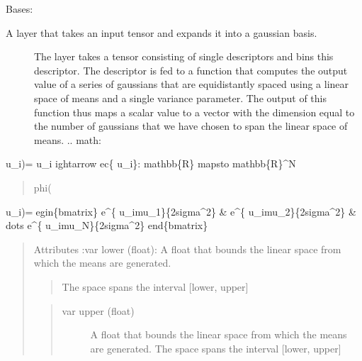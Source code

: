 \documentclass[letterpaper,10pt,english]{sphinxmanual}
\begin{document}

\begin{fulllineitems}
\label{\detokenize{modules/gqcml.nn:gqcml.nn.layers.GaussianExpansion}}
Bases: 
\begin{description}
\item[{A layer that takes an input tensor and expands it into a gaussian basis.}] \leavevmode
The layer takes a tensor consisting of single descriptors and bins this descriptor.
The descriptor is fed to a function that computes the output value of a series of gaussians
that are equidistantly spaced using a linear space of means and a single variance parameter.
The output of this function thus maps a scalar value to a vector with the dimension equal to the
number of gaussians that we have chosen to span the linear space of means.
.. math:

\begin{sphinxVerbatim}[commandchars=\\\{\}]
\PYGZbs{}
\end{sphinxVerbatim}

\end{description}

u\_i)=
u\_i
ightarrow
ec\{
u\_i\}: mathbb\{R\} mapsto mathbb\{R\}\textasciicircum{}N
\begin{quote}

phi(
\end{quote}

u\_i)=egin\{bmatrix\} e\textasciicircum{}\{
u\_i\sphinxhyphen{}mu\_1\}\{2sigma\textasciicircum{}2\} \& e\textasciicircum{}\{
u\_i\sphinxhyphen{}mu\_2\}\{2sigma\textasciicircum{}2\} \& dots e\textasciicircum{}\{
u\_i\sphinxhyphen{}mu\_N\}\{2sigma\textasciicircum{}2\} end\{bmatrix\}
\begin{quote}

Attributes
:var lower (float): A float that bounds the linear space from which the means are generated.
\begin{quote}

The space spans the interval {[}lower, upper{]}
\end{quote}
\begin{quote}\begin{description}
\item[{var upper (float)}] \leavevmode
A float that bounds the linear space from which the means are generated.
The space spans the interval {[}lower, upper{]}


\end{description}
\end{quote}
\end{quote}
\end{fulllineitems}
\end{document}
